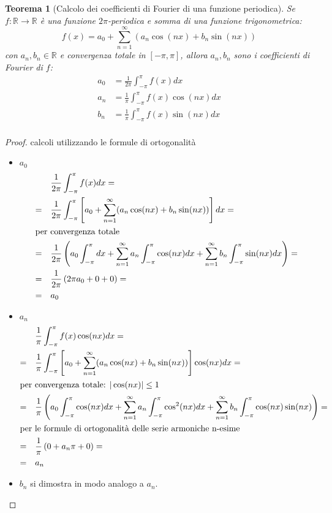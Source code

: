 \documentclass[12pt, a4paper]{article}
\theoremstyle{break}
\newtheorem{theorem}{Teorema} %
\begin{document}
\newpage
\begin{theorem} [Calcolo dei coefficienti di Fourier di una funzione periodica]
	Se $f: \mathbb{R} \to \mathbb{R}$ è una funzione $2\pi$-periodica e
	somma di una funzione trigonometrica:
	\[
		f(x) = a_0 + \sum_{n=1}^{\infty} (a_n \cos(nx) + b_n \sin(nx))
	\]
	con $a_n, b_n \in \mathbb{R}$ e convergenza totale in $[-\pi,\pi]$,
	allora $a_n, b_n$ sono i coefficienti di Fourier di $f$:
	\begin{align*}
		a_0 & = \frac{1}{2\pi} \int_{-\pi}^{\pi} f(x) dx         \\
		a_n & = \frac{1}{\pi} \int_{-\pi}^{\pi} f(x) \cos(nx) dx \\
		b_n & = \frac{1}{\pi} \int_{-\pi}^{\pi} f(x) \sin(nx) dx \\
	\end{align*}
\end{theorem}
\begin{proof} calcoli utilizzando le formule di ortogonalità
	\begin{itemize}
		\item $a_0$
			\begin{align*}
				        & \frac{1}{2\pi} \int_{-\pi}^{\pi} f(x) dx =           \\
				= \quad & \frac{1}{2\pi} \int_{-\pi}^{\pi} \left[a_0 +
				\sum_{n=1}^{\infty} (a_n \cos(nx) + b_n \sin(nx))\right] dx  = \\
				\intertext{per convergenza totale}
				= \quad & \frac{1}{2\pi} \left( a_0 \int_{-\pi}^{\pi} dx +
				\sum_{n=1}^{\infty} a_n \int_{-\pi}^{\pi} \cos(nx) dx +
				\sum_{n=1}^{\infty} b_n \int_{-\pi}^{\pi} \sin(nx) dx \right)
				=                                                              \\
				= \quad & \frac{1}{2\pi} \left( 2\pi a_0 + 0 + 0 \right)   =   \\
				= \quad & a_0
			\end{align*}
		\item $a_n$
			\begin{align*}
				        & \frac{1}{\pi} \int_{-\pi}^{\pi} f(x) \cos(nx) dx =       \\
				= \quad & \frac{1}{\pi} \int_{-\pi}^{\pi} \left[a_0 +
				\sum_{n=1}^{\infty} (a_n \cos(nx) + b_n \sin(nx))\right]
				\cos(nx) dx =                                                      \\
				\intertext{per convergenza totale: $| \cos(nx) | \leq 1$ }
				= \quad & \frac{1}{\pi} \left( a_0 \int_{-\pi}^{\pi} \cos(nx) dx +
				\sum_{n=1}^{\infty} a_n \int_{-\pi}^{\pi} \cos^2(nx) dx +
				\sum_{n=1}^{\infty} b_n \int_{-\pi}^{\pi} \cos(nx) \sin(nx)
				\right)                                                 =          \\
				\intertext{per le formule di ortogonalità delle serie armoniche
				n-esime}
				= \quad & \frac{1}{\pi} \left( 0 + a_n \pi + 0 \right)  =          \\
				= \quad & a_n
			\end{align*}
		\item $b_n$ si dimostra in modo analogo a $a_n$.
	\end{itemize}
\end{proof}
\end{document}
